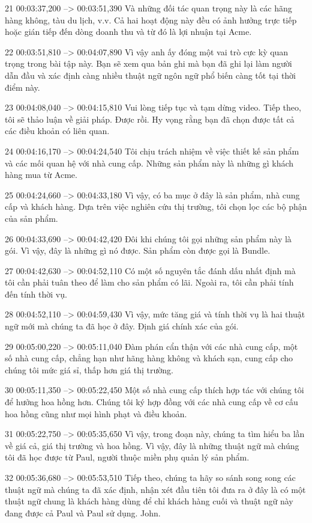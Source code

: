 21
00:03:37,200 --> 00:03:51,390
Và những đối tác quan trọng này là các hãng hàng không, tàu du lịch, v.v. Cả hai hoạt động này đều có ảnh hưởng trực tiếp hoặc gián tiếp đến dòng doanh thu và từ đó là lợi nhuận tại Acme.

22
00:03:51,810 --> 00:04:07,890
Vì vậy anh ấy đóng một vai trò cực kỳ quan trọng trong bài tập này.  Bạn sẽ xem qua bản ghi mà bạn đã ghi lại làm người dẫn đầu và xác định càng nhiều thuật ngữ ngôn ngữ phổ biến càng tốt tại thời điểm này.

23
00:04:08,040 --> 00:04:15,810
Vui lòng tiếp tục và tạm dừng video.  Tiếp theo, tôi sẽ thảo luận về giải pháp.  Được rồi.  Hy vọng rằng bạn đã chọn được tất cả các điều khoản có liên quan.

24
00:04:16,170 --> 00:04:24,540
Tôi chịu trách nhiệm về việc thiết kế sản phẩm và các mối quan hệ với nhà cung cấp.  Những sản phẩm này là những gì khách hàng mua từ Acme.

25
00:04:24,660 --> 00:04:33,180
Vì vậy, có ba mục ở đây là sản phẩm, nhà cung cấp và khách hàng.  Dựa trên việc nghiên cứu thị trường, tôi chọn lọc các bộ phận của sản phẩm.

26
00:04:33,690 --> 00:04:42,420
Đôi khi chúng tôi gọi những sản phẩm này là gói.  Vì vậy, đây là những gì nó được.  Sản phẩm còn được gọi là Bundle.

27
00:04:42,630 --> 00:04:52,110
Có một số nguyên tắc đánh dấu nhất định mà tôi cần phải tuân theo để làm cho sản phẩm có lãi.  Ngoài ra, tôi cần phải tính đến tính thời vụ.

28
00:04:52,110 --> 00:04:59,430
Vì vậy, mức tăng giá và tính thời vụ là hai thuật ngữ mới mà chúng ta đã học ở đây.  Định giá chính xác của gói.

29
00:05:00,220 --> 00:05:11,040
Đàm phán cẩn thận với các nhà cung cấp, một số nhà cung cấp, chẳng hạn như hãng hàng không và khách sạn, cung cấp cho chúng tôi mức giá sỉ, thấp hơn giá thị trường.

30
00:05:11,350 --> 00:05:22,450
Một số nhà cung cấp thích hợp tác với chúng tôi để hưởng hoa hồng hơn.  Chúng tôi ký hợp đồng với các nhà cung cấp về cơ cấu hoa hồng cũng như mọi hình phạt và điều khoản.

31
00:05:22,750 --> 00:05:35,650
Vì vậy, trong đoạn này, chúng ta tìm hiểu ba lần về giá cả, giá thị trường và hoa hồng.  Vì vậy, đây là những thuật ngữ mà chúng tôi đã học được từ Paul, người thuộc miền phụ quản lý sản phẩm.

32
00:05:36,680 --> 00:05:53,510
Tiếp theo, chúng ta hãy so sánh song song các thuật ngữ mà chúng ta đã xác định, nhận xét đầu tiên tôi đưa ra ở đây là có một thuật ngữ chung là khách hàng dùng để chỉ khách hàng cuối và thuật ngữ này đang được cả Paul và Paul sử dụng.  John.

